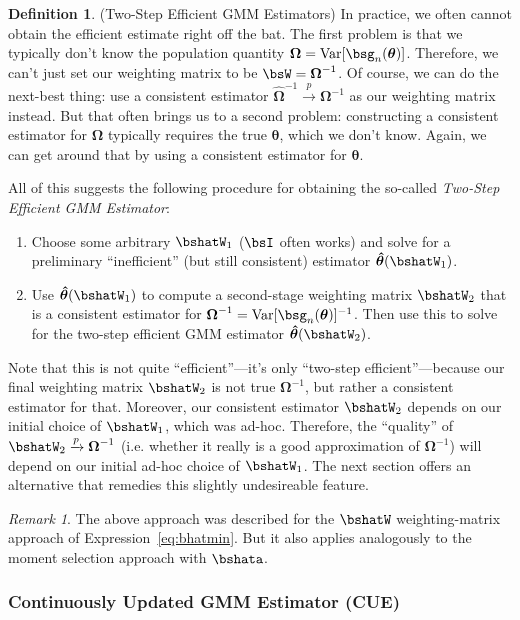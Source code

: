 \documentclass[12pt]{article}
\theoremstyle{plain}
\theoremstyle{definition}
\newtheorem{defn}[thm]{Definition}
\theoremstyle{remark}
\newtheorem*{rmk}{Remark}
\newcommand{\bstheta}{\boldsymbol{\theta}}
\newcommand{\bsOmega}{\boldsymbol{\Omega}}
\newcommand{\bshattheta}{\boldsymbol{\hat{\theta}}}
\newcommand{\bshatOmega}{\boldsymbol{\hat{\Omega}}}
\newcommand{\Var}{\operatorname{Var}}
\newcommand{\pto}{\xrightarrow{p}}
\begin{document}
\begin{defn}(Two-Step Efficient GMM Estimators)
In practice, we often cannot obtain the efficient estimate right off the
bat.
The first problem is that we typically don't know the population
quantity $\bsOmega=\Var[\bsg_n(\bstheta)]$. Therefore, we
can't just set our weighting matrix to be $\bsW=\bsOmega^{-1}$.
Of course, we can do the next-best thing: use a consistent estimator
$\bshatOmega^{-1}\pto\bsOmega^{-1}$ as our weighting matrix instead. But
that often brings us to a second problem: constructing a consistent
estimator for $\bsOmega$ typically requires the true $\bstheta$, which
we don't know. Again, we can get around that by using a consistent
estimator for $\bstheta$.

All of this suggests the following procedure for obtaining the
so-called \emph{Two-Step Efficient GMM Estimator}:
\begin{enumerate}
  \item Choose some arbitrary $\bshatW_1$ ($\bsI$ often works) and solve
    for a preliminary ``inefficient'' (but still consistent) estimator
    $\bshattheta(\bshatW_1)$.
  \item Use $\bshattheta(\bshatW_1)$ to compute a second-stage weighting
    matrix $\bshatW_2$ that is a consistent estimator for
    $\bsOmega^{-1}=\Var[\bsg_n(\bstheta)]^{-1}$. Then use this to solve
    for the two-step efficient GMM estimator $\bshattheta(\bshatW_2)$.
\end{enumerate}
Note that this is not quite ``efficient''---it's only ``two-step
efficient''---because our final weighting matrix $\bshatW_2$ is not
true $\bsOmega^{-1}$, but rather a consistent estimator for that.
Moreover, our consistent estimator $\bshatW_2$ depends on our initial
choice of $\bshatW_1$, which was ad-hoc. Therefore, the ``quality'' of
$\bshatW_2\pto\bsOmega^{-1}$ (i.e. whether it really is a good
approximation of $\bsOmega^{-1}$) will depend on our initial ad-hoc
choice of $\bshatW_1$. The next section offers an alternative that
remedies this slightly undesireable feature.
\end{defn}
\begin{rmk}
The above approach was described for the $\bshatW$ weighting-matrix
approach of Expression~\ref{eq:bhatmin}. But it also applies analogously
to the moment selection approach with $\bshata$.
\end{rmk}


\clearpage
\subsubsection{Continuously Updated GMM Estimator (CUE)}
\end{document}
